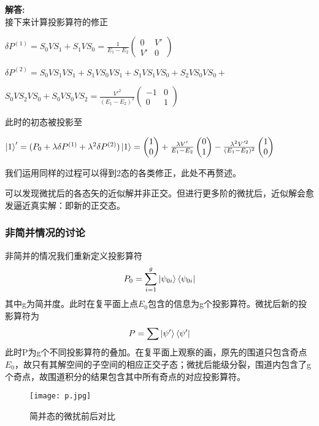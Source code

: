 \documentclass[12pt, a4paper, oneside]{ctexart}
\newenvironment{solution}
  {\par\noindent\textbf{解答:}\quad}
  {\par}
\begin{document}
\begin{solution}
    \qquad\\

    接下来计算投影算符的修正

    \(\delta P^{(1)}=S_0VS_1+S_1VS_0=\frac{1}{E_1-E_2}\begin{pmatrix}
        0&V'\\
        V'&0
    \end{pmatrix}\)

    \(\delta P^{(2)}=S_0VS_1VS_1+S_1VS_0VS_1+S_1VS_1VS_0+S_2VS_0VS_0+\)

    \(S_0VS_2VS_0+S_0VS_0VS_2=\frac{V'^2}{(E_1-E_2)^2}\begin{pmatrix}
        -1&0\\
        0&1
    \end{pmatrix}\)


    此时的初态被投影至

    $\ket{1}'=(P_0+\lambda\delta P^{(1)}+\lambda^2 \delta P^{(2)})\ket{1}=\begin{pmatrix}
        1\\
        0
    \end{pmatrix}+\frac{\lambda V'}{E_1-E_2}\begin{pmatrix}
        0\\
        1
    \end{pmatrix}-\frac{\lambda^2V'^2}{(E_1-E_2)^2}\begin{pmatrix}
        1\\
        0
    \end{pmatrix}$

    我们运用同样的过程可以得到2态的各类修正，此处不再赘述。

\end{solution}


可以发现微扰后的各态矢的近似解并非正交。但进行更多阶的微扰后，近似解会愈发逼近真实解：即新的正交态。

\subsubsection{非简并情况的讨论}
非简并的情况我们重新定义投影算符
\begin{equation}
    P_0=\sum_{i=1}^{g}\ket{\psi_{0i}}\bra{\psi_{0i}}
\end{equation}
其中g为简并度。此时在复平面上点$E_0$包含的信息为g个投影算符。微扰后新的投影算符为
\begin{equation}
    P=\sum \ket{\psi '}\bra{\psi '}
\end{equation}
此时P为g个不同投影算符的叠加。在复平面上观察的画，原先的围道只包含奇点$E_0$，故只有其解空间的子空间的相应正交子态；微扰后能级分裂，围道内包含了g个奇点，故围道积分的结果包含其中所有奇点的对应投影算符。
\begin{figure}[htbp]
    \centering
    \texttt{[image: p.jpg]}
    \vspace{10pt} %
	\caption{简并态的微扰前后对比}
\end{figure}
\end{document}
